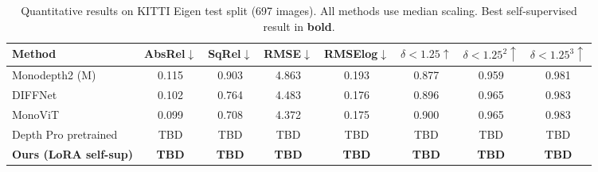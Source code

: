 \begin{table}[h]
\centering
\caption{Quantitative results on KITTI Eigen test split (697 images). All methods use median scaling. Best self-supervised result in \textbf{bold}.}
\label{tab:kitti_results}
\begin{tabular}{lccccccc}
\toprule
Method & AbsRel$\downarrow$ & SqRel$\downarrow$ & RMSE$\downarrow$ & RMSElog$\downarrow$ & $\delta<1.25\uparrow$ & $\delta<1.25^2\uparrow$ & $\delta<1.25^3\uparrow$ \\
\midrule
Monodepth2 (M) \cite{iccv2019} & 0.115 & 0.903 & 4.863 & 0.193 & 0.877 & 0.959 & 0.981 \\
DIFFNet \cite{eccv2022} & 0.102 & 0.764 & 4.483 & 0.176 & 0.896 & 0.965 & 0.983 \\
MonoViT \cite{3dv2022} & 0.099 & 0.708 & 4.372 & 0.175 & 0.900 & 0.965 & 0.983 \\
\midrule
Depth Pro pretrained & TBD & TBD & TBD & TBD & TBD & TBD & TBD \\
\textbf{Ours (LoRA self-sup)} & \textbf{TBD} & \textbf{TBD} & \textbf{TBD} & \textbf{TBD} & \textbf{TBD} & \textbf{TBD} & \textbf{TBD} \\
\bottomrule
\end{tabular}
\end{table}